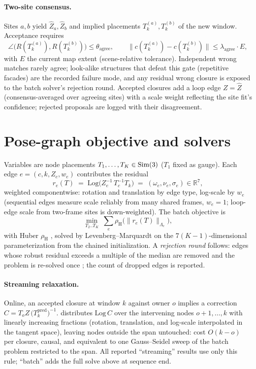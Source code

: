\paragraph{Two-site consensus.}
Sites $a,b$ yield $\hat Z_a,\hat Z_b$ and implied placements
$T_k^{(a)},T_k^{(b)}$ of the new window. Acceptance requires
\begin{equation}
\angle\big(R(T_k^{(a)}),R(T_k^{(b)})\big) \le \theta_{\text{agree}},
\qquad
\big\|c(T_k^{(a)})-c(T_k^{(b)})\big\| \le \lambda_{\text{agree}}\cdot E,
\end{equation}
with $E$ the current map extent (scene-relative tolerance). Independent
wrong matches rarely agree; look-alike structures that defeat this gate
(repetitive facades) are the recorded failure mode, and any residual wrong
closure is exposed to the batch solver's rejection round. Accepted closures
add a loop edge $Z=\hat Z$ (consensus-averaged over agreeing sites) with a
scale weight reflecting the site fit's confidence; rejected proposals are
logged with their disagreement.

\section{Pose-graph objective and solvers}
\label{app:pgo}
Variables are node placements $T_1,\dots,T_K\in\mathrm{Sim}(3)$ ($T_1$ fixed as
gauge). Each edge $e=(c,k,Z_e,w_e)$ contributes the residual
\begin{equation}
r_e(T) \;=\; \mathrm{Log}\!\big(Z_e^{-1}\, T_c^{-1} T_k\big)
\;=\;(\omega_e,\nu_e,\sigma_e)\in\mathbb{R}^{7},
\end{equation}
weighted componentwise: rotation and translation by edge type, log-scale by
$w_e$ (sequential edges measure scale reliably from many shared frames,
$w_e{=}1$; loop-edge scale from two-frame sites is down-weighted). The
batch objective is
\begin{equation}
\min_{T_2..T_K}\; \sum_e \rho_{\text{H}}\!\big(\|r_e(T)\|_{\Lambda_e}\big),
\end{equation}
with Huber $\rho_{\text{H}}$ \citep{huber}, solved by Levenberg--Marquardt
on the $7(K{-}1)$-dimensional parameterization from the chained
initialization. A \emph{rejection round} follows: edges whose robust
residual exceeds a multiple of the median are removed and the problem is
re-solved once \citep{grisetti}; the count of dropped edges is reported.

\paragraph{Streaming relaxation.}
Online, an accepted closure at window $k$ against owner $o$ implies a
correction $C = T_o Z\, \big(T_k^{\text{pred}}\big)^{-1}$. \smr{}
distributes $\mathrm{Log}\,C$ over the intervening nodes
$o{+}1,\dots,k$ with linearly increasing fractions (rotation, translation,
and log-scale interpolated in the tangent space), leaving nodes outside the
span untouched: cost $O(k-o)$ per closure, causal, and equivalent to one
Gauss--Seidel sweep of the batch problem restricted to the span. All
reported ``streaming'' results use only this rule; ``batch'' adds the full
solve above at sequence end.

